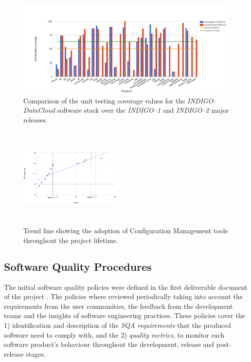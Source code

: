 \documentclass[journal]{IEEEtran}
\begin{document}
\begin{figure}[ht]
\centering
\includegraphics[width=\textwidth]{images/unittest.png}
\caption{Comparison of the unit testing coverage values for the {\sl INDIGO--DataCloud} software stack over the {\sl INDIGO--1} and {\sl INDIGO--2} major releases.}
\label{fig:fig_unittest}
\end{figure}

\begin{figure}[ht]
\centering
\includegraphics[width=0.45\textwidth, height=50mm]{images/confman.png}
\caption{Trend line showing the adoption of Configuration Management tools throughout the project lifetime.}
\label{fig:fig_confman}
\end{figure}

\subsection{Software Quality Procedures}
\label{subsec:sqa}

The initial software quality policies were defined in the first deliverable document of the
project \cite{indigo-d31}. The policies where reviewed periodically taking into account the requirements
from the user communities, the feedback from the development teams and the insights of software engineering practices. These policies cover the 1) identification
and description of the \emph{SQA requirements} that the produced software need
to comply with, and the 2) \emph{quality metrics}, to monitor each software product's
behaviour throughout the development, release and post--release stages.
\end{document}
